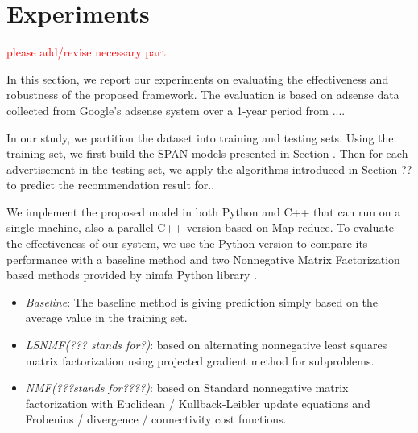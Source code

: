 \section{Experiments}
\label{sec:exp}

\textcolor{red}{ please add/revise necessary part}

In this section, we report our experiments on evaluating
the effectiveness and robustness of the proposed framework.
The evaluation is based on adsense data collected
from Google's adsense system over
a 1-year period from ....

In our study, we partition the dataset into training and
testing sets. Using the training
set, we first build the SPAN models presented in Section \cite{model}.
Then for each advertisement  in the testing set, we apply the algorithms introduced in Section ?? to predict the recommendation result for..

We implement the proposed {\sppan} model in both Python and C++ that can
run on a single machine, also a parallel C++ version based on Map-reduce. 
To evaluate the effectiveness of our system, we use the Python version to compare its performance with a baseline method and two Nonnegative Matrix Factorization based methods provided by nimfa Python library \cite{ZitnikZ12}.  

\begin{itemize} \itemsep -2pt
\item {\em Baseline}: The baseline method is giving prediction simply
  based on the average value in the training set.
\item {\em LSNMF(??? stands for?)}: based on alternating nonnegative least
  squares matrix factorization using projected gradient method for
  subproblems\cite{lin2007projected}.
\item {\em NMF(???stands for????)}: based on Standard nonnegative matrix
  factorization with Euclidean / Kullback-Leibler update equations and
  Frobenius / divergence / connectivity cost
  functions\cite{lee2001algorithms, brunet2004metagenes}.
\end{itemize}


